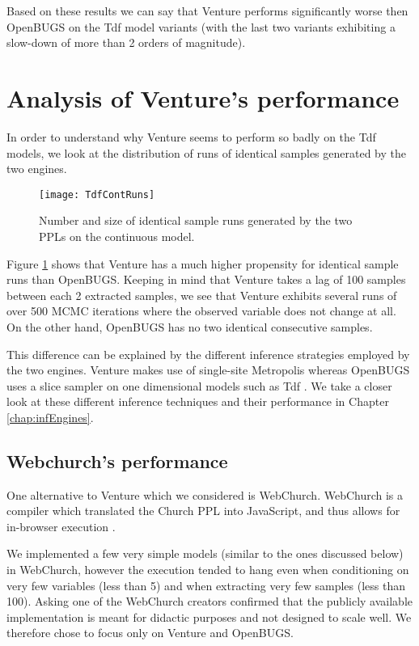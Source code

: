 Based on these results we can say that Venture performs significantly worse then OpenBUGS on the Tdf model variants (with the last two variants exhibiting a slow-down of more than 2 orders of magnitude).

\section{Analysis of Venture's performance}

In order to understand why Venture seems to perform so badly on the Tdf models, we look at the distribution of runs of identical samples generated by the two engines.

\begin{figure}[h]
    \centering
    \texttt{[image: TdfContRuns]}
    \caption{Number and size of identical sample runs generated by the two PPLs on the continuous model.}
    \label{fig:tdfContRun}
\end{figure}

Figure \ref{fig:tdfContRun} shows that Venture has a much higher propensity for identical sample runs than OpenBUGS. Keeping in mind that Venture takes a lag of 100 samples between each 2 extracted samples, we see that Venture exhibits several runs of over 500 MCMC iterations where the observed variable does not change at all. On the other hand, OpenBUGS has no two identical consecutive samples.

This difference can be explained by the different inference strategies employed by the two engines. Venture makes use of single-site Metropolis whereas OpenBUGS uses a slice sampler on one dimensional models such as Tdf \cite{lunn2000winbugs, keith2008generalized}. We take a closer look at these different inference techniques and their performance in Chapter \ref{chap:infEngines}.

\subsection{Webchurch's performance}
One alternative to Venture which we considered is WebChurch. WebChurch is a compiler which translated the Church PPL into JavaScript, and thus allows for in-browser execution \cite{webChurch}.

We implemented a few very simple models (similar to the ones discussed below) in WebChurch, however the execution tended to hang even when conditioning on very few variables (less than 5) and when extracting very few samples (less than 100). Asking one of the WebChurch creators confirmed that the publicly available implementation is meant for didactic purposes and not designed to scale well. We therefore chose to focus only on Venture and OpenBUGS.
